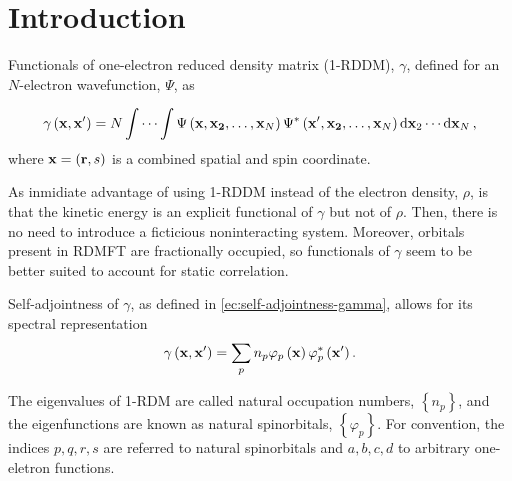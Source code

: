 \graphicspath{{./figures/}}

\section{Introduction}
Functionals of one-electron reduced density matrix (1-RDDM), $\gamma$, defined
for an $N$-electron wavefunction, $\Psi$, as

\begin{equation} \label{ec:self-adjointness-gamma}
    \gamma \left( \boldsymbol{\mathrm{x}}, \boldsymbol{\mathrm{x}}^{\prime} \right) =
    N \idotsint
    \Psi \left( \boldsymbol{\mathrm{x}}, \boldsymbol{\mathrm{x_2}}, \ldots,  \boldsymbol{\mathrm{x}}_N \right)
    \Psi^{*} \left( \boldsymbol{\mathrm{x}}^{\prime}, \boldsymbol{\mathrm{x_2}}, \ldots,  \boldsymbol{\mathrm{x}}_N \right)
    \dd{ \boldsymbol{\mathrm{x}}_2} \cdots \dd{ \boldsymbol{\mathrm{x}}_N}
    ,
\end{equation}
where $ \boldsymbol{\mathrm{x}} = \left( \boldsymbol{\mathrm{r}}, s \right)$ is a combined spatial and spin
coordinate.

As inmidiate advantage of using 1-RDDM instead of the electron density, $\rho$,
is that the kinetic energy is an explicit functional of $\gamma$ but not of
$\rho$.
Then, there is no need to introduce a ficticious noninteracting system.
Moreover, orbitals present in RDMFT are fractionally occupied, so functionals 
of $\gamma$ seem to be better suited to account for static correlation.

Self-adjointness of $\gamma$, as defined in \cref{ec:self-adjointness-gamma},
allows for its spectral representation
\begin{equation}
    \gamma \left( \boldsymbol{\mathrm{x}}, \boldsymbol{\mathrm{x}}^{\prime} \right) =
    \sum_{p} n_p 
    \varphi_p \left( \boldsymbol{\mathrm{x}} \right)
    \varphi_p^{*} \left( \boldsymbol{\mathrm{x}}^{\prime} \right)
    .
\end{equation}

The eigenvalues of 1-RDM are called natural occupation numbers,
$\left\{ n_p \right\}$, and the eigenfunctions are known as natural
spinorbitals, $\left\{ \varphi_p \right\}$.
For convention, the indices $p,q,r,s$ are referred to natural spinorbitals
and $a,b,c,d$ to arbitrary one-eletron functions.
